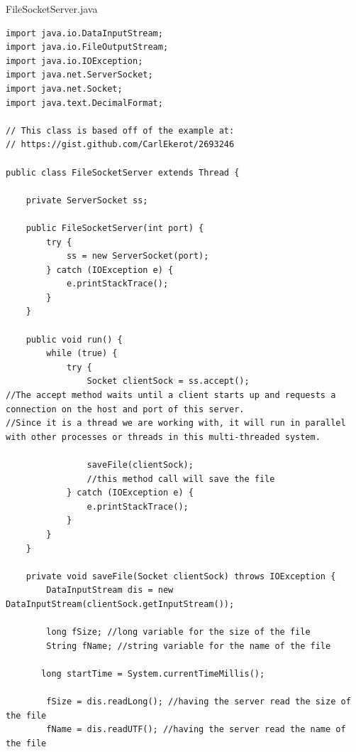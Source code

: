 \documentclass{article}
\begin{document}
FileSocketServer.java
\begin{lstlisting}
import java.io.DataInputStream;
import java.io.FileOutputStream;
import java.io.IOException;
import java.net.ServerSocket;
import java.net.Socket;
import java.text.DecimalFormat;

// This class is based off of the example at:
// https://gist.github.com/CarlEkerot/2693246

public class FileSocketServer extends Thread {

    private ServerSocket ss;

    public FileSocketServer(int port) {
        try {
            ss = new ServerSocket(port);
        } catch (IOException e) {
            e.printStackTrace();
        }
    }

    public void run() {
        while (true) {
            try {
                Socket clientSock = ss.accept();
//The accept method waits until a client starts up and requests a connection on the host and port of this server.
//Since it is a thread we are working with, it will run in parallel with other processes or threads in this multi-threaded system.

                saveFile(clientSock);
                //this method call will save the file
            } catch (IOException e) {
                e.printStackTrace();
            }
        }
    }

    private void saveFile(Socket clientSock) throws IOException {
        DataInputStream dis = new DataInputStream(clientSock.getInputStream());

        long fSize; //long variable for the size of the file
        String fName; //string variable for the name of the file
		
	   long startTime = System.currentTimeMillis();	   
	   
        fSize = dis.readLong(); //having the server read the size of the file
        fName = dis.readUTF(); //having the server read the name of the file


\end{lstlisting}
\end{document}
